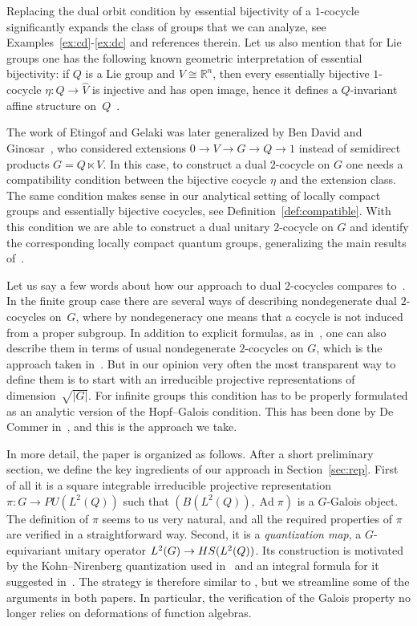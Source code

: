 \documentclass[a4paper,11pt,reqno]{amsart}
\numberwithin{equation}{section}
\theoremstyle{remark}
\theoremstyle{definition}
\newcommand\Ad{\operatorname{Ad}}
\newcommand\HS{{\rm HS}}
\newcommand{\R}{{\mathbb R}}
\begin{document}
Replacing the dual orbit condition by essential bijectivity of a $1$-cocycle significantly expands the class of groups that we can analyze, see Examples~\ref{ex:cd}-\ref{ex:dc} and references therein. Let us also mention that for Lie groups one has the following known geometric interpretation of essential bijectivity: if $Q$ is a Lie group and $V\cong\R^n$, then every essentially bijective $1$-cocycle $\eta\colon Q\to\hat V$ is injective and has open image, hence it defines a $Q$-invariant affine structure on~$Q$~\cite{MR1272113}.

The work of Etingof and Gelaki was later generalized by Ben David and Ginosar~\cite{MR2534251}, who considered extensions $0\to V\to G\to Q\to1$ instead of
semidirect products $G=Q\ltimes V$. In this case, to construct a dual $2$-cocycle on $G$ one needs a compatibility condition between the bijective cocycle $\eta$ and the extension class. The same condition makes sense in our analytical setting of locally compact groups and essentially bijective cocycles, see Definition~\ref{def:compatible}. With this condition we are able to construct a dual unitary $2$-cocycle on $G$ and identify the corresponding locally compact quantum groups, generalizing the main results of~\cites{BGNT3,GM}.

Let us say a few words about how our approach to dual $2$-cocycles compares to~\cites{EG,MR2534251}. In the finite group case there are several ways of describing nondegenerate dual $2$-cocycles on~$G$, where by nondegeneracy one means that a cocycle is not induced from a proper subgroup. In addition to explicit formulas, as in~\cite{EG}, one can also describe them in terms of usual nondegenerate $2$-cocycles on $G$, which is the approach taken in~\cite{MR2534251}. But in our opinion very often the most transparent way to define them is to start with an irreducible projective representations of dimension~$\sqrt{|G|}$. For infinite groups this condition has to be properly formulated as an analytic version of the Hopf--Galois condition. This has been done by De Commer in~\cite{DC}, and this is the approach we take.

\smallskip

In more detail, the paper is organized as follows. After a short preliminary section, we define the key ingredients of our approach in Section~\ref{sec:rep}. First of all it is a square integrable irreducible projective representation $\pi\colon G\to PU(L^2(Q))$ such that $(B(L^2(Q)),\Ad\pi)$ is a $G$-Galois object. The definition of $\pi$ seems to us very natural, and all the required properties of $\pi$ are verified in a straightforward way. Second, it is a \emph{quantization map}, a $G$-equivariant unitary operator $L^2(G)\to \HS(L^2(Q))$. Its construction is motivated by the Kohn--Nirenberg quantization used in~\cite{BGNT3} and an integral formula for it suggested in~\cite{GM}. The strategy is therefore similar to \cites{BGNT3,GM}, but we streamline some of the arguments in both papers. In particular, the verification of the Galois property no longer relies on deformations of function algebras.
\end{document}
